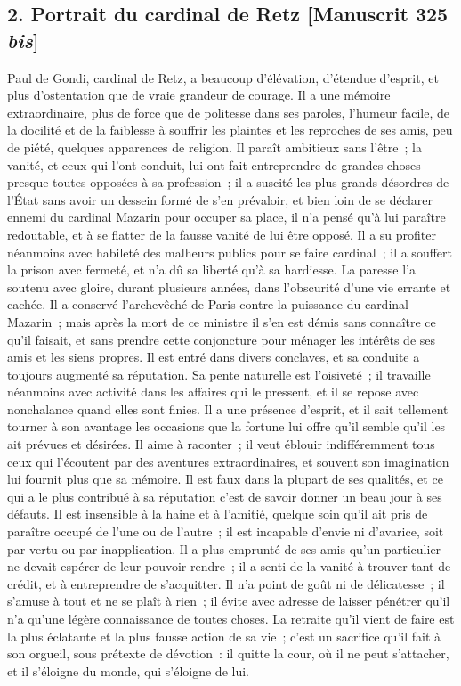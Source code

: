 \documentclass[french,twoside]{book} %
\begin{document}
\subsection[{2. Portrait du cardinal de Retz [Manuscrit 325 bis]}]{2. Portrait du cardinal de Retz [Manuscrit 325 {\itshape bis}]}
\noindent Paul de Gondi, cardinal de Retz, a beaucoup d’élévation, d’étendue d’esprit, et plus d’ostentation que de vraie grandeur de courage. Il a une mémoire extraordinaire, plus de force que de politesse dans ses paroles, l’humeur facile, de la docilité et de la faiblesse à souffrir les plaintes et les reproches de ses amis, peu de piété, quelques apparences de religion. Il paraît ambitieux sans l’être ; la vanité, et ceux qui l’ont conduit, lui ont fait entreprendre de grandes choses presque toutes opposées à sa profession ; il a suscité les plus grands désordres de l’État sans avoir un dessein formé de s’en prévaloir, et bien loin de se déclarer ennemi du cardinal Mazarin pour occuper sa place, il n’a pensé qu’à lui paraître redoutable, et à se flatter de la fausse vanité de lui être opposé. Il a su profiter néanmoins avec habileté des malheurs publics pour se faire cardinal ; il a souffert la prison avec fermeté, et n’a dû sa liberté qu’à sa hardiesse. La paresse l’a soutenu avec gloire, durant plusieurs années, dans l’obscurité d’une vie errante et cachée. Il a conservé l’archevêché de Paris contre la puissance du cardinal Mazarin ; mais après la mort de ce ministre il s’en est démis sans connaître ce qu’il faisait, et sans prendre cette conjoncture pour ménager les intérêts de ses amis et les siens propres. Il est entré dans divers conclaves, et sa conduite a toujours augmenté sa réputation. Sa pente naturelle est l’oisiveté ; il travaille néanmoins avec activité dans les affaires qui le pressent, et il se repose avec nonchalance quand elles sont finies. Il a une présence d’esprit, et il sait tellement tourner à son avantage les occasions que la fortune lui offre qu’il semble qu’il les ait prévues et désirées. Il aime à raconter ; il veut éblouir indifféremment tous ceux qui l’écoutent par des aventures extraordinaires, et souvent son imagination lui fournit plus que sa mémoire. Il est faux dans la plupart de ses qualités, et ce qui a le plus contribué à sa réputation c’est de savoir donner un beau jour à ses défauts. Il est insensible à la haine et à l’amitié, quelque soin qu’il ait pris de paraître occupé de l’une ou de l’autre ; il est incapable d’envie ni d’avarice, soit par vertu ou par inapplication. Il a plus emprunté de ses amis qu’un particulier ne devait espérer de leur pouvoir rendre ; il a senti de la vanité à trouver tant de crédit, et à entreprendre de s’acquitter. Il n’a point de goût ni de délicatesse ; il s’amuse à tout et ne se plaît à rien ; il évite avec adresse de laisser pénétrer qu’il n’a qu’une légère connaissance de toutes choses. La retraite qu’il vient de faire est la plus éclatante et la plus fausse action de sa vie ; c’est un sacrifice qu’il fait à son orgueil, sous prétexte de dévotion : il quitte la cour, où il ne peut s’attacher, et il s’éloigne du monde, qui s’éloigne de lui.
\end{document}
